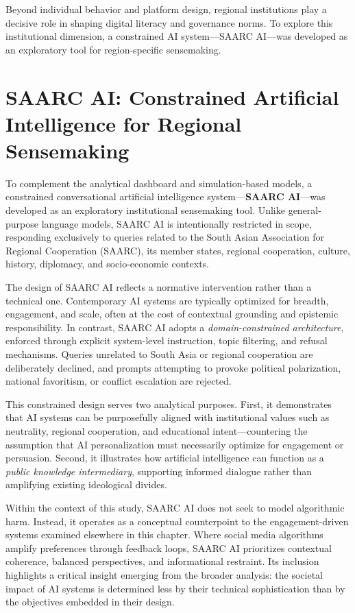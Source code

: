 \documentclass[12pt,a4paper]{report}
\begin{document}
Beyond individual behavior and platform design, regional institutions play a decisive role in shaping digital literacy and governance norms. To explore this institutional dimension, a constrained AI system—SAARC AI—was developed as an exploratory tool for region-specific sensemaking.


\section{SAARC AI: Constrained Artificial Intelligence for Regional Sensemaking}

To complement the analytical dashboard and simulation-based models, a constrained conversational artificial intelligence system—\textbf{SAARC AI}—was developed as an exploratory institutional sensemaking tool. Unlike general-purpose language models, SAARC AI is intentionally restricted in scope, responding exclusively to queries related to the South Asian Association for Regional Cooperation (SAARC), its member states, regional cooperation, culture, history, diplomacy, and socio-economic contexts.

The design of SAARC AI reflects a normative intervention rather than a technical one. Contemporary AI systems are typically optimized for breadth, engagement, and scale, often at the cost of contextual grounding and epistemic responsibility. In contrast, SAARC AI adopts a \emph{domain-constrained architecture}, enforced through explicit system-level instruction, topic filtering, and refusal mechanisms. Queries unrelated to South Asia or regional cooperation are deliberately declined, and prompts attempting to provoke political polarization, national favoritism, or conflict escalation are rejected.

This constrained design serves two analytical purposes. First, it demonstrates that AI systems can be purposefully aligned with institutional values such as neutrality, regional cooperation, and educational intent—countering the assumption that AI personalization must necessarily optimize for engagement or persuasion. Second, it illustrates how artificial intelligence can function as a \emph{public knowledge intermediary}, supporting informed dialogue rather than amplifying existing ideological divides.

Within the context of this study, SAARC AI does not seek to model algorithmic harm. Instead, it operates as a conceptual counterpoint to the engagement-driven systems examined elsewhere in this chapter. Where social media algorithms amplify preferences through feedback loops, SAARC AI prioritizes contextual coherence, balanced perspectives, and informational restraint. Its inclusion highlights a critical insight emerging from the broader analysis: the societal impact of AI systems is determined less by their technical sophistication than by the objectives embedded in their design.
\end{document}
